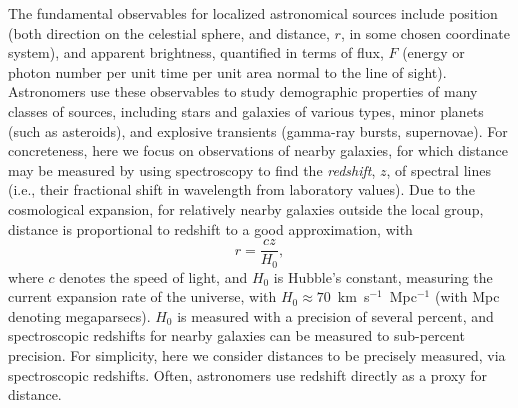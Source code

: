 The fundamental observables for localized astronomical sources include position (both direction on the celestial sphere, and distance, $r$, in some chosen coordinate system), and apparent brightness, quantified in terms of flux, $F$ (energy or photon number per unit time per unit area normal to the line of sight).
Astronomers use these observables to study demographic properties of many classes of sources, including stars and galaxies of various types, minor planets (such as asteroids), and explosive transients (gamma-ray bursts, supernovae).
For concreteness, here we focus on observations of nearby galaxies, for which distance may be measured by using spectroscopy to find the \emph{redshift}, $z$, of spectral lines (i.e., their fractional shift in wavelength from laboratory values).
Due to the cosmological expansion, for relatively nearby galaxies outside the local group, distance is proportional to redshift to a good approximation, with
\begin{equation}
r = \frac{cz}{H_0},
\label{eq:H0}
\end{equation}
where $c$ denotes the speed of light, and $H_0$ is Hubble's constant, measuring the current expansion rate of the universe, with $H_0 \approx 70$~km~s$^{-1}$~Mpc$^{-1}$ (with Mpc denoting megaparsecs).
$H_0$ is measured with a precision of several percent, and spectroscopic redshifts for nearby galaxies can be measured to sub-percent precision.
For simplicity, here we consider distances to be precisely measured, via spectroscopic redshifts.
Often, astronomers use redshift directly as a proxy for distance.

